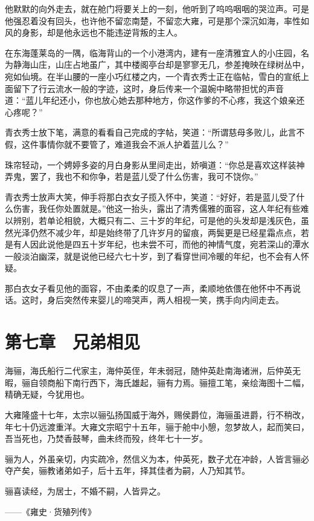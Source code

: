 他默默的向外走去，就在舱门将要关上的一刻，他听到了呜呜咽咽的哭泣声。可是他强忍着没有回头，也许他不留恋南楚，不留恋大雍，可是那个深沉如海，率性如风的身影，却是他永远也不能违逆背叛的主人。

在东海蓬莱岛的一隅，临海背山的一个小港湾内，建有一座清雅宜人的小庄园，名为静海山庄，山庄占地虽广，其中楼阁亭台却是寥寥无几，参差掩映在绿树丛中，宛如仙境。在半山腰的一座小巧红楼之内，一个青衣秀士正在临帖，雪白的宣纸上面留下了行云流水一般的字迹，这时，身后传来一个温婉中略带担忧的声音道：“蓝儿年纪还小，你也放心她去那种地方，你这作爹的不心疼，我这个娘亲还心疼呢？”

青衣秀士放下笔，满意的看看自己完成的字帖，笑道：“所谓慈母多败儿，此言不假，这件事情你就不要管了，难道我会不派人护着蓝儿么？”

珠帘轻动，一个娉婷多姿的月白身影从里间走出，娇嗔道：“你总是喜欢这样装神弄鬼，罢了，我也不和你争，若是蓝儿受了什么伤害，我可不饶你。”

青衣秀士放声大笑，伸手将那白衣女子揽入怀中，笑道：“好好，若是蓝儿受了什么伤害，我任你处置就是。”他这一抬头，露出了清秀儒雅的面容，这人年纪有些难以辨别，若单论相貌，大概只有二、三十岁的年纪，可是他的头发却是浅灰色，虽然光泽仍然不减少年，却是始终带了几许岁月的留痕，两鬓更是已经星霜点点，若是有人因此说他是四五十岁年纪，也未尝不可，而他的神情气度，宛若深山的潭水一般淡泊幽深，就是说他已经六七十岁，到了看穿世间冷暖的年纪，也不会有人怀疑。

那白衣女子看见他的面容，不由柔柔的叹息了一声，柔顺地依偎在他怀中不再说话。这时，身后突然传来婴儿的啼哭声，两人相视一笑，携手向内间走去。

\chapter{第七章　兄弟相见}

海骊，海氏船行二代家主，海仲英侄，年未弱冠，随仲英赴南海诸洲，后仲英无暇，骊自领商船下南行西下，海氏雄起，骊有力焉。骊擅工笔，亲绘海图十二幅，精确无疑，今犹用也。

大雍隆盛十七年，太宗以骊弘扬国威于海外，赐侯爵位，海骊虽进爵，行不稍改，年七十仍远渡重洋。大雍文宗昭宁十五年，骊于舱中小憩，忽梦故人，起而笑曰，吾当死也，乃焚香鼓琴，曲未终而殁，终年七十一岁。

骊为人，外虽亲切，内实疏冷，然信义为本，仲英死，数子尤在冲龄，人皆言骊必夺产矣，骊教诸弟如子，后十五年，择其佳者为嗣，人乃知其节。

骊喜读经，为居士，不婚不嗣，人皆异之。

——《雍史·货殖列传》

